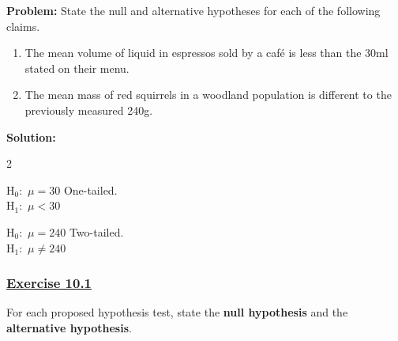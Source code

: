 \documentclass[
  11pt,
]{book}
\begin{document}
\begin{tcolorbox}[title=Example,colback=RoyalBlue!1!,colframe=RoyalBlue]
\textbf{Problem:} State the null and alternative hypotheses for each of the following claims.

\vspace{0.2cm}

\begin{enumerate}
    \item[(a)] The mean volume of liquid in espressos sold by a café is less than the 30ml stated on their menu. 
    \item[(b)] The mean mass of red squirrels in a woodland population is different to the previously measured 240g.
\end{enumerate}

\tcblower
\textbf{Solution:}
\begin{enumerate}
    \begin{multicols}{2}
    \item[(a)] $\text{H}_\text{0}:$  $\mu=\text{30}$ \quad \textnormal{  One-tailed.}\\ $\text{H}_\text{1}:$  $\mu<\text{30}$
    \item[(b)] $\text{H}_\text{0}:$  $\mu=\text{240}$ \quad \textnormal{Two-tailed.}\\ $\text{H}_\text{1}:$  $\mu\ne\text{240}$
    \end{multicols}
\end{enumerate}
\end{tcolorbox}

\label{ex101q}{}

\subsubsection*{\texorpdfstring{\hyperref[ex101a]{Exercise 10.1}}{Exercise 10.1}}\label{exercise-10.1}

For each proposed hypothesis test, state the \textbf{null hypothesis} and the \textbf{alternative hypothesis}.
\end{document}
